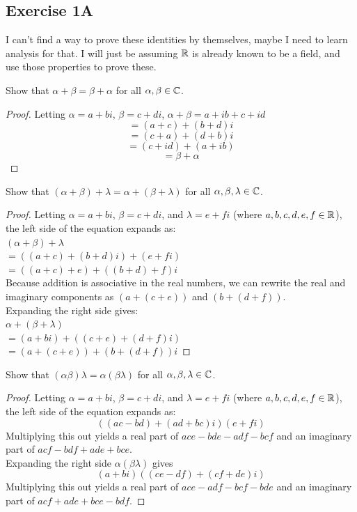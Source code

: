 \subsection{Exercise 1A}
\begin{tcolorbox}[colback=yellow!20, colframe=yellow!80!black, title=My thoughts]
	I can't find a way to prove these identities by themselves, maybe I need to learn analysis for that. I will just be assuming $\mathbb{R}$ is already known to be a field, and use those properties to prove these.
\end{tcolorbox}
\begin{question}
	Show that $\alpha + \beta = \beta + \alpha$ for all $\alpha, \beta \in \mathbb{C}$.  
\end{question}
\begin{proof}
	Letting $\alpha = a+bi$, $\beta = c+di$, $\alpha + \beta = a + ib + c + id$
	\[= (a + c) + (b + d)i\]
	\[= (c + a) + (d + b)i\]
	\[= (c + id) + (a + ib)\]
	\[= \beta + \alpha\]
\end{proof}
\begin{question}
	Show that $(\alpha + \beta) + \lambda = \alpha + (\beta + \lambda)$ for all $\alpha, \beta, \lambda \in \mathbb{C}$.     
\end{question}
\begin{proof}
	Letting $\alpha = a+bi$, $\beta = c+di$, and $\lambda = e+fi$ (where $a, b, c, d, e, f \in \mathbb{R}$), the left side of the equation expands as:\\$(\alpha + \beta) + \lambda$\\$= ((a+c) + (b+d)i) + (e+fi)$\\$= ((a+c)+e) + ((b+d)+f)i$\\Because addition is associative in the real numbers, we can rewrite the real and imaginary components as $(a+(c+e))$ and $(b+(d+f))$.\\Expanding the right side gives:\\$\alpha + (\beta + \lambda)$\\$= (a+bi) + ((c+e) + (d+f)i)$\\$= (a+(c+e)) + (b+(d+f))i$
\end{proof}
\begin{question}
	Show that $(\alpha\beta)\lambda = \alpha(\beta\lambda)$ for all $\alpha, \beta, \lambda \in \mathbb{C}$.
\end{question}
\begin{proof}
	Letting $\alpha = a+bi$, $\beta = c+di$, and $\lambda = e+fi$ (where $a, b, c, d, e, f \in \mathbb{R}$), the left side of the equation expands as:\[((ac-bd) + (ad+bc)i)(e+fi)\] Multiplying this out yields a real part of $ace - bde - adf - bcf$ and an imaginary part of $acf - bdf + ade + bce$.\\Expanding the right side $\alpha(\beta\lambda)$ gives \[(a+bi)((ce-df) + (cf+de)i)\] Multiplying this out yields a real part of $ace - adf - bcf - bde$ and an imaginary part of $acf + ade + bce - bdf$.
\end{proof}
